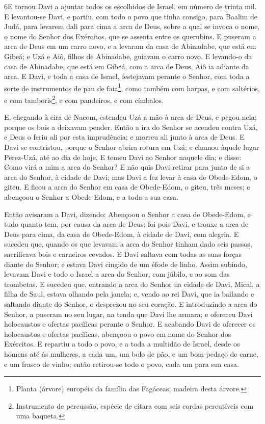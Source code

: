\lettrine{6} E tornou Davi a ajuntar todos os escolhidos de
Israel, em número de trinta mil. E levantou-se Davi, e partiu,
com todo o povo que tinha consigo, para Baalim de Judá, para levarem
dali para cima a arca de Deus, sobre a qual se invoca o nome, o nome
do Senhor dos Exércitos, que se assenta entre os querubins. E
puseram a arca de Deus em um carro novo, e a levaram da casa de
Abinadabe, que está em Gibeá; e Uzá e Aiô, filhos de Abinadabe,
guiavam o carro novo. E levando-o da casa de Abinadabe, que está
em Gibeá, com a arca de Deus, Aiô ia adiante da arca. E Davi, e
toda a casa de Israel, festejavam perante o Senhor, com toda a sorte
de instrumentos de pau de faia\footnote{Planta (árvore) européia da
família das Fagáceas; madeira desta árvore.}, como também com
harpas, e com saltérios, e com tamboris\footnote{Instrumento de
percussão, espécie de cítara com seis cordas percutíveis com uma
baqueta.}, e com pandeiros, e com címbalos.

E, chegando à eira de Nacom, estendeu Uzá a mão à arca de Deus, e
pegou nela; porque os bois a deixavam pender. Então a ira do
Senhor se acendeu contra Uzá, e Deus o feriu ali por esta
imprudência; e morreu ali junto à arca de Deus. E Davi se
contristou, porque o Senhor abrira rotura em Uzá; e chamou àquele
lugar Perez-Uzá, até ao dia de hoje. E temeu Davi ao Senhor
naquele dia; e disse: Como virá a mim a arca do Senhor? E não
quis Davi retirar para junto de si a arca do Senhor, à cidade de
Davi; mas Davi a fez levar à casa de Obede-Edom, o giteu. E
ficou a arca do Senhor em casa de Obede-Edom, o giteu, três meses; e
abençoou o Senhor a Obede-Edom, e a toda a sua casa.

Então avisaram a Davi, dizendo: Abençoou o Senhor a casa de
Obede-Edom, e tudo quanto tem, por causa da arca de Deus; foi pois
Davi, e trouxe a arca de Deus para cima, da casa de Obede-Edom, à
cidade de Davi, com alegria. E sucedeu que, quando os que
levavam a arca do Senhor tinham dado seis passos, sacrificava bois e
carneiros cevados. E Davi saltava com todas as suas forças
diante do Senhor; e estava Davi cingido de um éfode de linho.
Assim subindo, levavam Davi e todo o Israel a arca do Senhor,
com júbilo, e ao som das trombetas. E sucedeu que, entrando a
arca do Senhor na cidade de Davi, Mical, a filha de Saul, estava
olhando pela janela; e, vendo ao rei Davi, que ia bailando e
saltando diante do Senhor, o desprezou no seu coração. E
introduzindo a arca do Senhor, a puseram no seu lugar, na tenda que
Davi lhe armara; e ofereceu Davi holocaustos e ofertas pacíficas
perante o Senhor. E acabando Davi de oferecer os holocaustos
e ofertas pacíficas, abençoou o povo em nome do Senhor dos
Exércitos. E repartiu a todo o povo, e a toda a multidão de
Israel, desde os homens até às mulheres, a cada um, um bolo de pão,
e um bom pedaço de carne, e um frasco de vinho; então retirou-se
todo o povo, cada um para sua casa.

